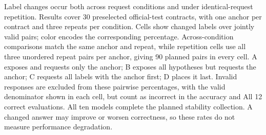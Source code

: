 Label changes occur both across request conditions and under identical-request repetition. Results cover 30 preselected official-test contracts, with one anchor per contract and three repeats per condition. Cells show changed labels over jointly valid pairs; color encodes the corresponding percentage. Across-condition comparisons match the same anchor and repeat, while repetition cells use all three unordered repeat pairs per anchor, giving 90 planned pairs in every cell. A exposes and requests only the anchor; B exposes all hypotheses but requests the anchor; C requests all labels with the anchor first; D places it last. Invalid responses are excluded from these pairwise percentages, with the valid denominator shown in each cell, but count as incorrect in the accuracy and All 12 correct evaluations. All ten models complete the planned stability collection. A changed answer may improve or worsen correctness, so these rates do not measure performance degradation.
